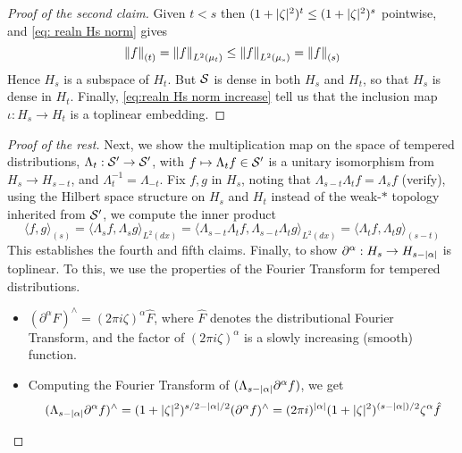 \documentclass[../main-v2-manifolds.tex]{subfiles}
\begin{document}
\begin{proof}[Proof of the second claim]
Given $t<s$ then $(1+\vert {\zeta} \vert^2)^{t}\leq (1+\vert {\zeta} \vert^2)^{s}$ pointwise, and \cref{eq: realn Hs norm} gives
\begin{equation}
\norm{f}_{(t)} = \norm{f}_{L^2(\mu_t)}\leq \norm{f}_{L^2(\mu_s)} = \norm{f}_{(s)}
\label{eq:realn Hs norm increase}
\end{equation}
Hence $H_s$ is a subspace of  $H_t$. But $\mathcal{S}$ is dense in both $H_s$ and $H_t$, so that $H_s$ is dense in $H_t$. Finally, \cref{eq:realn Hs norm increase} tell us that the inclusion map $\iota: H_s\to H_t$ is a toplinear embedding.
\end{proof}
\begin{proof}[Proof of the rest]
Next, we show the multiplication map on the space of tempered distributions, $\Lambda_t: \mathcal{S}'\to \mathcal{S}'$, with $f\mapsto \Lambda_t f\in \mathcal{S}'$ is a unitary isomorphism from $H_s\to H_{s-t}$, and $\Lambda_t^{-1} = \Lambda_{-t}$. Fix $f,g$ in $H_s$, noting that $\Lambda_{s-t}\Lambda_{t} f = \Lambda_s f$ (verify), using the Hilbert space structure on $H_s$ and $H_t$ instead of the weak-$\ast$ topology inherited from $\mathcal{S}'$, we compute the inner product
\[
\langle f,g\rangle_{(s)}= \langle \Lambda_s f,\Lambda_s g \rangle_{L^2(dx)}
= \langle\Lambda_{s-t}\Lambda_{t} f, \Lambda_{s-t}\Lambda_{t} g  \rangle_{L^2(dx)}= \langle \Lambda_t f,\Lambda_t g \rangle_{(s-t)}
\]
This establishes the fourth and fifth claims. Finally, to show $\partial^\alpha: H_s\to H_{s-\vert {\alpha} \vert}$ is toplinear. To this, we use the properties of the Fourier Transform for tempered distributions.
\begin{itemize}
    \item $(\partial^\alpha F)^{\wedge} = (2\pi i \zeta)^{\alpha}\hat{F}$, where $\hat{F}$ denotes the distributional Fourier Transform, and the factor of $(2\pi  i \zeta)^{\alpha}$ is a slowly increasing (smooth) function.
    \item Computing the Fourier Transform of $(\Lambda_{s-\vert {\alpha} \vert}\partial^\alpha f)$, we get
    \[
    (\Lambda_{s-\vert {\alpha} \vert}\partial^\alpha f)^{\wedge} = (1+\vert {\zeta} \vert^2)^{s/2 - \vert {\alpha} \vert/2}(\partial^\alpha f)^{\wedge}
    = (2\pi i)^{\vert {\alpha} \vert}(1+\vert {\zeta} \vert^2)^{(s-\vert {\alpha} \vert)/2} \zeta^\alpha\hat{f}
    \]
\end{itemize}


\end{proof}
\end{document}
